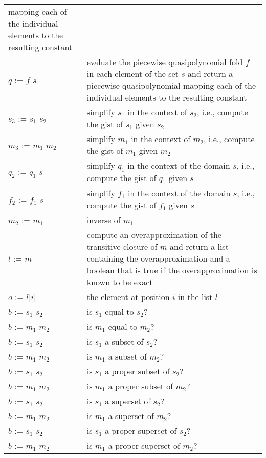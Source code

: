 \begin{supertabular}{lp{0.7\textwidth}}
mapping each of the individual elements to the resulting
constant
\\
$q$ := $f$  $s$ &
evaluate the piecewise quasipolynomial fold $f$ in each element
of the set $s$ and return a piecewise quasipolynomial
mapping each of the individual elements to the resulting
constant
\\
$s_3$ := $s_1$ \ai[\tt]{\%} $s_2$ &
simplify $s_1$ in the context of $s_2$, i.e., compute
the gist of $s_1$ given $s_2$
\\
$m_3$ := $m_1$ \ai[\tt]{\%} $m_2$ &
simplify $m_1$ in the context of $m_2$, i.e., compute
the gist of $m_1$ given $m_2$
\\
$q_2$ := $q_1$ \ai[\tt]{\%} $s$ &
simplify $q_1$ in the context of the domain $s$, i.e., compute
the gist of $q_1$ given $s$
\\
$f_2$ := $f_1$ \ai[\tt]{\%} $s$ &
simplify $f_1$ in the context of the domain $s$, i.e., compute
the gist of $f_1$ given $s$
\\
$m_2$ := $m_1$ & inverse of $m_1$
\\
$l$ := $m$\ai[\tt]{\^{}+} &
compute an overapproximation of the transitive closure
of $m$ and return a list containing the overapproximation
and a boolean that is true if the overapproximation
is known to be exact
\\
$o$ := $l$[$i$] &
the element at position $i$ in the list $l$
\\
$b$ := $s_1$ \ai[\tt]{=} $s_2$ & is $s_1$ equal to $s_2$?
\\
$b$ := $m_1$ \ai[\tt]{=} $m_2$ & is $m_1$ equal to $m_2$?
\\
$b$ := $s_1$ \ai[\tt]{<=} $s_2$ & is $s_1$ a subset of $s_2$?
\\
$b$ := $m_1$ \ai[\tt]{<=} $m_2$ & is $m_1$ a subset of $m_2$?
\\
$b$ := $s_1$ \ai[\tt]{<} $s_2$ & is $s_1$ a proper subset of $s_2$?
\\
$b$ := $m_1$ \ai[\tt]{<} $m_2$ & is $m_1$ a proper subset of $m_2$?
\\
$b$ := $s_1$ \ai[\tt]{>=} $s_2$ & is $s_1$ a superset of $s_2$?
\\
$b$ := $m_1$ \ai[\tt]{>=} $m_2$ & is $m_1$ a superset of $m_2$?
\\
$b$ := $s_1$ \ai[\tt]{>} $s_2$ & is $s_1$ a proper superset of $s_2$?
\\
$b$ := $m_1$ \ai[\tt]{>} $m_2$ & is $m_1$ a proper superset of $m_2$?
\\
\end{supertabular}
